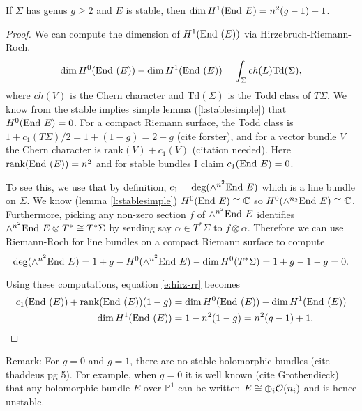 	\begin{lemma}
		If $\Sigma$ has genus $g\geq 2$ and $E$ is stable, then $\dim H^1(\text{End } E) = n^2(g-1)+1$.
	\end{lemma}
	\begin{proof}
		We can compute the dimension of $H^1(\text{End }(E))$ via Hirzebruch-Riemann-Roch. 
		\begin{equation}
			\label{e:hirz-rr}
			\dim H^0(\text{End }(E)) - \dim H^1(\text{End }(E)) = \int_\Sigma ch(L)\text{Td}(\Sigma),
		\end{equation}
		where $ch(V)$ is the Chern character and $\text{Td}(\Sigma)$ is the Todd class of $T\Sigma$. We know from the stable implies simple lemma (\ref{l:stablesimple}) that $H^0(\text{End } E)=0$. For a compact Riemann surface, the Todd class is $1+c_1(T\Sigma)/2 = 1+(1-g) = 2-g$ (cite forster), and for a vector bundle $V$ the Chern character is $\text{rank}(V) + c_1(V)$ (citation needed). Here $\text{rank}(\text{End }(E)) = n^2$ and for stable bundles I claim $c_1(\text{End } E) =0$.
		
		To see this, we use that by definition, $c_1 = \deg(\wedge^{n^2} \text{End } E)$ which is a line bundle on $\Sigma$. We know (lemma \ref{l:stablesimple}) $H^0(\text{End } E) \cong \mathbb{C}$ so $H^0(\wedge^{n_2} \text{End } E) \cong \mathbb{C}$. Furthermore, picking any non-zero section $f$ of $\wedge^{n^2} \text{End } E$ identifies $\wedge^{n^2}\text{End } E \otimes T^\ast \cong T^\ast\Sigma$ by sending say $\alpha \in T^\ast \Sigma$ to $f\otimes \alpha$. Therefore we can use Riemann-Roch for line bundles on a compact Riemann surface to compute
		\begin{equation}
			\deg(\wedge^{n^2} \text{End } E) = 1 + g - H^0(\wedge^{n^2}\text{End } E) - \dim H^0(T^\ast \Sigma) = 1+g-1-g = 0.
		\end{equation}
		
		Using these computations, equation \ref{e:hirz-rr} becomes 
		\begin{align*}
			c_1(\text{End }(E)) + \text{rank}(\text{End }(E))(1-g) &= \dim H^0(\text{End }(E)) - \dim H^1(\text{End }(E))\\
			\dim H^1(\text{End }(E)) &= 1 - n^2(1-g) = n^2(g-1) + 1.
		\end{align*}
	\end{proof}
	Remark: For $g=0$ and $g=1$, there are no stable holomorphic bundles (cite thaddeus pg 5). For example, when $g=0$ it is well known (cite Grothendieck) that any holomorphic bundle $E$ over $\mathbb{P}^1$ can be written $E \cong \oplus_{i}\mathcal{O}(n_i)$ and is hence unstable.
	
